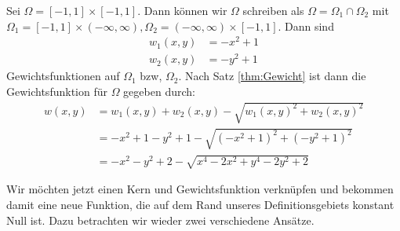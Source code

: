 \begin{example}
Sei $\Omega = [-1,1] \times [-1,1]$. Dann können wir $\Omega$ schreiben als $\Omega = \Omega_1  \cap \Omega_2$ mit $\Omega_1 = [-1,1] \times (- \infty, \infty), \Omega_2 =   (- \infty, \infty) \times [-1,1]$.
Dann sind 
\begin{align*}
w_1(x,y) &= -x^2 +1\\
w_2(x,y) &= -y^2 +1 
\end{align*}
Gewichtsfunktionen auf $\Omega_1$ bzw, $\Omega_2$. Nach Satz \ref{thm:Gewicht} ist dann die Gewichtsfunktion für $\Omega$ gegeben durch:
\begin{align*}
w(x,y) &= w_1(x,y) + w_2(x,y) - \sqrt{w_1(x,y)^2 + w_2(x,y)^2}\\
&= -x^2 +1 -y^2 +1 - \sqrt{(-x^2+1)^2 + (-y^2+1)^2}\\
&= -x^2-y^2+2 - \sqrt{x^4 -2x^2 + y^4 -2y^2+2}
\end{align*}
\end{example}
Wir möchten jetzt einen Kern und Gewichtsfunktion verknüpfen und bekommen damit eine neue Funktion, die auf dem Rand unseres Definitionsgebiets konstant Null ist. Dazu betrachten wir wieder zwei verschiedene Ansätze.

